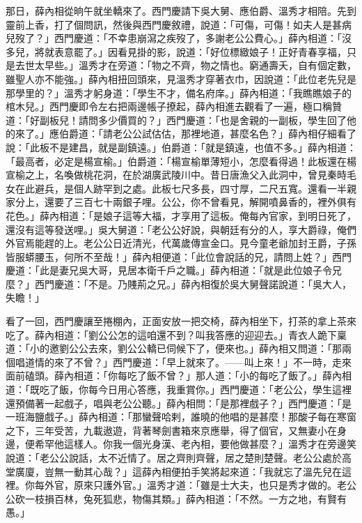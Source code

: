 那日，薛內相從晌午就坐轎來了。西門慶請下吳大舅、應伯爵、溫秀才相陪。先到靈前上香，打了個問訊，然後與西門慶敘禮，說道：「可傷，可傷！如夫人是甚病兒歿了？」西門慶道：「不幸患崩瀉之疾歿了，多謝老公公費心。」薛內相道：「沒多兒，將就表意罷了。」因看見掛的影，說道：「好位標緻娘子！正好青春享福，只是去世太早些。」溫秀才在旁道：「物之不齊，物之情也。窮通壽夭，自有個定數，雖聖人亦不能強。」薛內相扭回頭來，見溫秀才穿著衣巾，因說道：「此位老先兒是那學里的？」溫秀才躬身道：「學生不才，備名府庠。」薛內相道：「我瞧瞧娘子的棺木兒。」西門慶即令左右把兩邊帳子撩起，薛內相進去觀看了一遍，極口稱贊道：「好副板兒！請問多少價買的？」西門慶道：「也是舍親的一副板，學生回了他的來了。」應伯爵道：「請老公公試估估，那裡地道，甚麼名色？」薛內相仔細看了說：「此板不是建昌，就是副鎮遠。」伯爵道：「就是鎮遠，也值不多。」薛內相道：「最高者，必定是楊宣榆。」伯爵道：「楊宣榆單薄短小，怎麼看得過！此板還在楊宣榆之上，名喚做桃花洞，在於湖廣武陵川中。昔日唐漁父入此洞中，曾見秦時毛女在此避兵，是個人跡罕到之處。此板七尺多長，四寸厚，二尺五寬。還看一半親家分上，還要了三百七十兩銀子哩。公公，你不曾看見，解開噴鼻香的，裡外俱有花色。」薛內相道：「是娘子這等大福，才享用了這板。俺每內官家，到明日死了，還沒有這等發送哩。」吳大舅道：「老公公好說，與朝廷有分的人，享大爵祿，俺們外官焉能趕的上。老公公日近清光，代萬歲傳宣金口。見今童老爺加封王爵，子孫皆服蟒腰玉，何所不至哉！」薛內相便道：「此位會說話的兄，請問上姓？」西門慶道：「此是妻兄吳大哥，見居本衛千戶之職。」薛內相道：「就是此位娘子令兄麼？」西門慶道：「不是。乃賤荊之兄。」薛內相復於吳大舅聲諾說道：「吳大人，失瞻！」

看了一回，西門慶讓至捲棚內，正面安放一把交椅，薛內相坐下，打茶的拿上茶來吃了。薛內相道：「劉公公怎的這咱還不到？叫我答應的迎迎去。」青衣人跪下稟道：「小的邀劉公公去來，劉公公轎已伺候下了，便來也。」薛內相又問道：「那兩個唱道情的來了不曾？」西門慶道：「早上就來了。——叫上來！」不一時，走來面前磕頭。薛內相道：「你每吃了飯不曾？」那人道：「小的每吃了飯了。」薛內相道：「既吃了飯，你每今日用心答應，我重賞你。」西門慶道：「老公公，學生這裡還預備著一起戲子，唱與老公公聽。」薛內相問：「是那裡戲子？」西門慶道：「是一班海鹽戲子。」薛內相道：「那蠻聲哈剌，誰曉的他唱的是甚麼！那酸子每在寒窗之下，三年受苦，九載遨遊，背著琴劍書箱來京應舉，得了個官，又無妻小在身邊，便希罕他這樣人。你我一個光身漢、老內相，要他做甚麼？」溫秀才在旁邊笑說道：「老公公說話，太不近情了。居之齊則齊聲，居之楚則楚聲。老公公處於高堂廣廈，豈無一動其心哉？」這薛內相便拍手笑將起來道：「我就忘了溫先兒在這裡。你每外官，原來只護外官。」溫秀才道：「雖是士大夫，也只是秀才做的。老公公砍一枝損百林，兔死狐悲，物傷其類。」薛內相道：「不然。一方之地，有賢有愚。」

